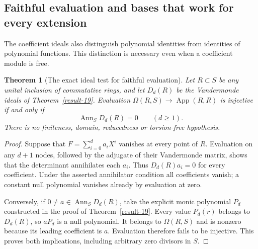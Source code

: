 \documentclass[11pt,a4paper]{article}
\newtheorem{theorem}{Theorem}[section]
\theoremstyle{definition}
\begin{document}
\subsection{Faithful evaluation and bases that work for every extension}
The coefficient ideals also distinguish polynomial identities from
identities of polynomial functions. This distinction is necessary even
when a coefficient module is free.

\begin{theorem}[The exact ideal test for faithful evaluation]\label{result-47}
Let $R\subset S$ be any unital inclusion of commutative rings, and
let $D_d(R)$ be the Vandermonde ideals of Theorem~\ref{result-19}.
Evaluation $\Omega(R,S)\to\operatorname{App}(R,R)$ is injective if and
only if
\[
              \operatorname{Ann}_S D_d(R)=0\qquad(d\ge1).
\]
There is no finiteness, domain, reducedness or torsion-free hypothesis.
\end{theorem}
\begin{proof}
Suppose that $F=\sum_{i=0}^d a_iX^i$ vanishes at every point of $R$.
Evaluation on any $d+1$ nodes, followed by the adjugate of their
Vandermonde matrix, shows that the determinant annihilates each $a_i$.
Thus $D_d(R)a_i=0$ for every coefficient. Under the asserted
annihilator condition all coefficients vanish; a constant null
polynomial vanishes already by evaluation at zero.

Conversely, if $0\ne a\in\operatorname{Ann}_S D_d(R)$, take the
explicit monic polynomial $P_d$ constructed in the proof of
Theorem~\ref{result-19}. Every value $P_d(r)$ belongs to $D_d(R)$, so
$aP_d$ is a null polynomial. It belongs to $\Omega(R,S)$ and is
nonzero because its leading coefficient is $a$. Evaluation therefore
fails to be injective. This proves both implications, including
arbitrary zero divisors in $S$.
\end{proof}
\end{document}
